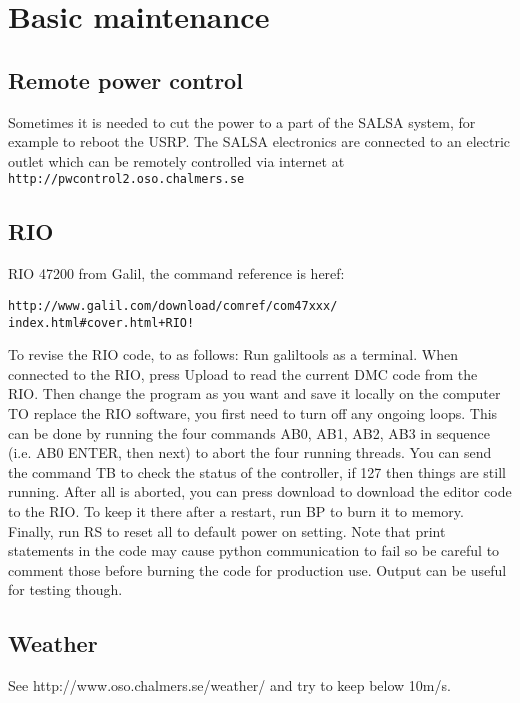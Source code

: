 \chapter{Basic maintenance}

\section{Remote power control}
Sometimes it is needed to cut the power to a part of the SALSA system,
for example to reboot the USRP. The SALSA electronics are connected to an electric outlet which
can be remotely controlled via internet at 
\verb! http://pwcontrol2.oso.chalmers.se!

\section{RIO}
RIO 47200 from Galil, the command reference is heref: 
\begin{verbatim}
http://www.galil.com/download/comref/com47xxx/
index.html#cover.html+RIO!
\end{verbatim}
To revise the RIO code, to as follows:
Run galiltools as a terminal. When connected to the RIO, press Upload to read
the current DMC code from the RIO. Then change the program as you want and
save it locally on the computer TO replace the RIO software, you first need
to turn off any ongoing loops. This can be done by running the four commands
AB0, AB1, AB2, AB3 in sequence (i.e. AB0 ENTER, then next) to abort the
four running threads. You can send the command TB to check the status
of the controller, if 127 then things are still running.
After all is aborted, you can press download to download the editor code to
the RIO. To keep it there after a restart, run BP to burn it to memory.
Finally, run RS to reset all to default power on setting.
Note that print statements in the code may cause python communication to fail
so be careful to comment those before burning the code for production use.
Output can be useful for testing though.

\section{Weather}
See http://www.oso.chalmers.se/weather/ and try to keep below 10m/s.

